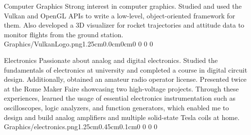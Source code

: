 \documentclass[10pt,onesize,a4paper,titlepage]{article}
\begin{document}
\begin{tcolorbox}[grow to left by=0.55cm,colframe=white,colback=white]
\begin{minipage}[t]{0.28\linewidth}
\begin{tcolorbox}[
            colback=lightgrey!70,
            colframe=accent,
            arc=2mm,
            boxrule=0.5mm,
            height=3cm
        ]
            \vspace{0.3em}
            \par\vspace{0.15cm}
        \end{tcolorbox}
    \end{minipage}
    \par
    \endgroup
    \end{tcolorbox}

    \begin{tcolorbox}[grow to left by=0.55cm,colframe=white,colback=white,before skip=-4mm]
    \end{tcolorbox}

    \vspace{-1cm}
    \begin{tcolorbox}[grow to left by=0.55cm,colframe=white,colback=white]
        \entryFocusDescWithPhoto{}
        {Computer Graphics}{}
        {
            Strong interest in computer graphics. Studied and used the Vulkan and OpenGL APIs to write a low-level, object-oriented framework for them. Also developed a 3D visualizer for rocket trajectories and attitude data to monitor flights from the ground station.
        }
        {Graphics/VulkanLogo.png}{1.25cm}{0.0cm}{0cm}{0 0 0 0}
    \end{tcolorbox}
    
    \vspace{-0.75cm}
    \begin{tcolorbox}[grow to left by=0.55cm,colframe=white,colback=white]
        \entryFocusDescWithPhoto{}
        {Electronics}{}
        {
            Passionate about analog and digital electronics. Studied the fundamentals of electronics at university and completed a course in digital circuit design. Additionally, obtained an amateur radio operator license. Presented twice at the Rome Maker Faire showcasing two high-voltage projects. Through these experiences, learned the usage of essential electronics instrumentation such as oscilloscopes, logic analyzers, and function generators, which enabled me to design and build analog amplifiers and multiple solid-state Tesla coils at home.
        }
        {Graphics/electronics.png}{1.25cm}{0.45cm}{0.1cm}{0 0 0 0}
    \end{tcolorbox}
\end{document}
